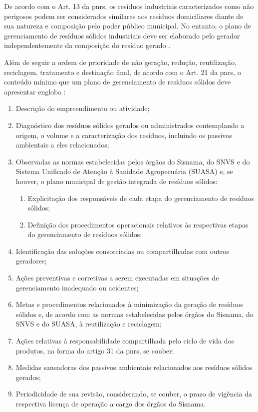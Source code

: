 	De acordo com o Art. 13 da \gls{pnrs}, os resíduos industriais caracterizados como não perigosos podem ser considerados similares aos resíduos domiciliares diante de sua natureza e composição pelo poder público municipal. No entanto, o plano de gerenciamento de resíduos sólidos industriais deve ser elaborado pelo gerador independentemente da composição do resíduo gerado \cite{brasil:12305}.

	Além de seguir a ordem de prioridade de não geração, redução, reutilização, reciclagem, tratamento e destinação final, de acordo com o Art. 21 da \gls{pnrs}, o conteúdo mínimo que um plano de gerenciamento de resíduos sólidos deve apresentar engloba \cite{brasil:12305}:
	
	\begin{enumerate}[label=\Roman*]
		\item Descrição do empreendimento ou atividade;
		\item Diagnóstico dos resíduos sólidos gerados ou administrados contemplando a origem, o volume e a caracterização dos resíduos, incluindo os passivos ambientais a eles relacionados;
		\item Observadas as normas estabelecidas pelos órgãos do Sisnama, do SNVS e do Sistema Unificado de Atenção à Sanidade Agropecuária (SUASA) e, se houver, o plano municipal de gestão integrada de resíduos sólidos:
		\begin{enumerate}[label=(\alph*)] 
			\item Explicitação dos responsáveis de cada etapa do gerenciamento de resíduos sólidos;
			\item Definição dos procedimentos operacionais relativos às respectivas etapas do gerenciamento de resíduos sólidos;
		\end{enumerate}
		\item Identificação das soluções consorciadas ou compartilhadas com outros geradores;
		\item Ações preventivas e corretivas a serem executadas em situações de gerenciamento inadequado ou acidentes;
		\item Metas e procedimentos relacionados à minimização da geração de resíduos sólidos e, de acordo com as normas estabelecidas pelos órgãos do Sisnama, do SNVS e do SUASA, à reutilização e reciclagem;
		\item Ações relativas à responsabilidade compartilhada pelo ciclo de vida dos produtos, na forma do artigo 31 da \gls{pnrs}, se couber;
		\item Medidas saneadoras dos passivos ambientais relacionados aos resíduos sólidos gerados;
		\item Periodicidade de sua revisão, considerando, se couber, o prazo de vigência da respectiva licença de operação a cargo dos órgãos do Sisnama.
	\end{enumerate}

